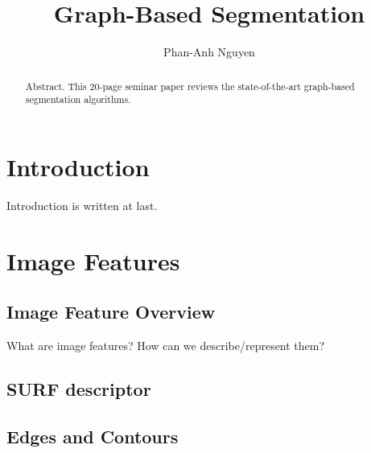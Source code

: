 \documentclass{SMBV12}
\begin{document}
\title{Graph-Based Segmentation}

\author{Phan-Anh Nguyen}

\maketitle


\begin{abstract}%
Abstract. This 20-page seminar paper reviews the state-of-the-art graph-based segmentation algorithms.
\end{abstract}



%
\section{Introduction}

Introduction is written at last.

%
\section{Image Features}

\subsection{Image Feature Overview}

What are image features? How can we describe/represent them?

\subsection{SURF descriptor}



\subsection{Edges and Contours}
\end{document}
